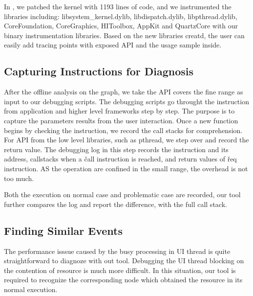 
In \xxx, we patched the kernel with 1193 lines of code, and we instrumented the
libraries including: libsystem\_kernel.dylib, libdispatch.dylib,
libpthread.dylib, CoreFoundation, CoreGraphics, HIToolbox, AppKit and
QuartzCore with our binary instrumentation libraries.  Based on the new
libraries creatd, the user can easily add tracing points with exposed API and
the usage sample inside.

\subsection{Capturing Instructions for Diagnosis}


After the offline analysis on the graph, we take the API covers the fine range
as input to our debugging scripts.  The debugging scripts go throught the
instruction from application and higher level frameworks step by step.  The
purpose is to capture the parameters results from the user interaction.  Once a
new function begins by checking the instruction, we record the call stacks for
comprehension.  For API from the low level libraries, such as pthread, we step
over and record the return value. The debugging log in this step records the
instruction and its address, callstacks when a \v{call} instruction is reached,
and return values of \v{req} instruction.  AS the operation are confined in the
small range, the overhead is not too much.

Both the execution on normal case and problematic case are recorded, our tool
further compares the log and report the difference, with the full call stack.

\subsection{Finding Similar Events}

The performance isssue caused by the busy processing in UI thread is quite
straightforward to diagnoze with out tool.  Debugging the UI thread blocking on
the contention of resource is much more difficult.  In this situation, our tool
is required to recognize the corresponding node which obtained the resource in
its normal execution.

